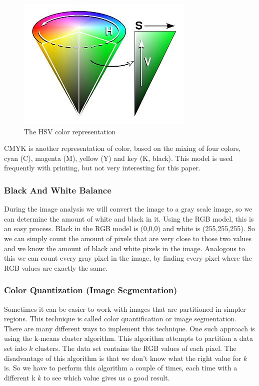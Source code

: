 \documentclass[12pt]{article}
\begin{document}
\begin{figure}[h]
\centering
\includegraphics[scale = 0.45]{img/hsv}
\caption{The HSV color representation}
\label{hsv}
\end{figure}

CMYK is another representation of color, based on the mixing of four colors, cyan (C), magenta (M), yellow (Y) and key (K, black). This model is used frequently with printing, but not very interesting for this paper.

\subsubsection{Black And White Balance}
During the image analysis we will convert the image to a gray scale image, so we can determine the amount of white and black in it. Using the RGB model, this is an easy process. Black in the RGB model is (0,0,0) and white is (255,255,255). So we can simply count the amount of pixels that are very close to those two values and we know the amount of black and white pixels in the image.
Analogous to this we can count every gray pixel in the image, by finding every pixel where the RGB values are exactly the same.

\subsubsection{Color Quantization (Image Segmentation)}

Sometimes it can be easier to work with images that are partitioned in simpler regions. This technique is called color quantification or image segmentation. There are many different ways to implement this technique. One such approach is using the k-means cluster algorithm. This algorithm attempts to partition a data set into $k$ clusters. The data set contains the RGB values of each pixel.
The disadvantage of this algorithm is that we don't know what the right value for $k$ is. So we have to perform this algorithm a couple of times, each time with a different k $k$ to see which value gives us a good result.
\newline
\end{document}
